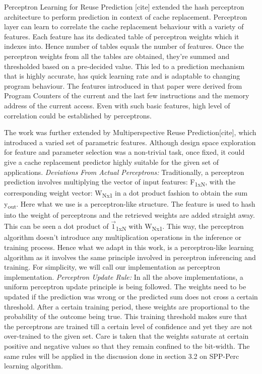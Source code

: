 \documentclass{sig-alternate}
\begin{document}
Perceptron Learning for Reuse Prediction [cite] extended the hash perceptron architecture to perform prediction in context of cache replacement. 
Perceptron layer can learn to correlate the cache replacement behaviour with a variety of features. 
Each feature has its dedicated table of perceptron weights which it indexes into. 
Hence number of tables equals the number of features. 
Once the perceptron weights from all the tables are obtained, they're summed and thresholded based on a pre-decided value. 
This led to a prediction mechanism that is highly accurate, has quick learning rate and is adaptable to changing program behaviour. 
The features introduced in that paper were derived from Program Counters of the current and the last few instructions and the memory address of the current access. 
Even with such basic features, high level of correlation could be established by perceptrons. 

The work was further extended by Multiperspective Reuse Prediction[cite], which introduced a varied set of parametric features. 
Although design space exploration for feature and parameter selection was a non-trivial task, once fixed, it could give a cache replacement predictor highly suitable for the given set of applications.
\newline
\newline
\textit{Deviations From Actual Perceptrons:} Traditionally, a perceptron prediction involves multiplying the vector of input features: F\textsubscript{1xN}, with the corresponding weight vector: W\textsubscript{Nx1} in a dot product fashion to obtain the sum y\textsubscript{out}. 
Here what we use is a perceptron-like structure. 
The feature is used to hash into the weight of perceptrons and the retrieved weights are added straight away. 
This can be seen a dot product of $\vec{1}$\textsubscript{1xN} with W\textsubscript{Nx1}. 
This way, the perceptron algorithm doesn't introduce any multiplication operations in the inference or training process. 
Hence what we adapt in this work, is a perceptron-like learning algorithm as it involves the same principle involved in perceptron inferencing and training. 
For simplicity, we will call our implementation as perceptron implementation.
\newline
\newline
\textit{Perceptron Update Rule:} In all the above implementations, a uniform perceptron update principle is being followed. 
The weights need to be updated if the prediction was wrong or the predicted sum does not cross a certain threshold. 
After a certain training period, these weights are proportional to the probability of the outcome being true. 
This training threshold makes sure that the perceptrons are trained till a certain level of confidence and yet they are not over-trained to the given set. 
Care is taken that the weights saturate at certain positive and negative values so that they remain confined to the bit-width. 
The same rules will be applied in the discussion done in section 3.2 on SPP-Perc learning algorithm.
\end{document}
